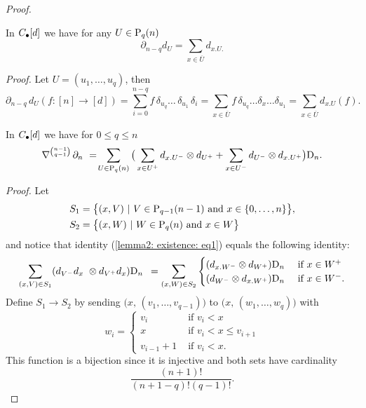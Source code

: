 \begin{proof}
	\begin{lemma} \label{lemma1: existence}
		In $\chains[d]$ we have for any $U \in \P_{q}(n)$
		\begin{equation} \label{lemma1: existence: eq1}
		\partial_{n-q} d_U = \sum_{x \in \overline{U}} d_{x.U.}
		\end{equation}
	\end{lemma}
	
	\textit{Proof.}
	Let $U = (u_1, \dots, u_q)$, then
	\begin{equation*}
	\partial_{n-q}\, d_U (f : [n] \to [d]) = 
	\sum_{i=0}^{n-q} f\, \delta_{u_q} \dots \,\delta_{u_1}\, \delta_i = 
	\sum_{x \in \overline{U}} f\, \delta_{u_q} \dots \delta_x \dots \delta_{u_1} = 
	\sum_{x \in \overline{U}} d_{x.U} (f).
	\end{equation*}
	
	\begin{lemma} \label{lemma2: existence}
		In $\chains[d]$ we have for $0 \leq q \leq n$
		\begin{equation} \label{lemma2: existence: eq1}
		\nabla^{ n-1 \choose q-1}\, \partial_n\ =\! \sum_{U \in \P_q(n)} \big( 
		\sum_{x \in U^+} d_{x.U^-} \tensor d_{U^+} + 
		\sum_{x \in U^-} d_{U^-} \tensor d_{x.U^+} \big) \D_n.
		\end{equation}
	\end{lemma}
	
	\textit{Proof.}
	Let
	\begin{align*}
	& S_1 = \big\{(x, V)\ |\ V\in\P_{q-1}(n-1) \text{ and } x\in\{0,\dots,n\}\big\}, \\
	& S_2 = \big\{(x, W)\ |\ W\in\P_{q}(n) \text{ and } x\in W\big\}
	\end{align*}
	and notice that identity (\ref{lemma2: existence: eq1}) equals the following identity:
	\begin{equation} \label{lemma2: existence: eq2}
	\sum_{(x,V) \in S_1} (d_{V^-}d_x\ \tensor d_{V^+}d_x) \D_n \ \, = 
	\sum_{(x,W) \in S_2} 
	\begin{cases}
	(d_{x.W^-} \tensor d_{W^+}) \D_n & \text{ if } x\in W^+\\
	(d_{W^-} \tensor d_{x.W^+}) \D_n & \text{ if } x\in W^-.
	\end{cases}
	\end{equation}	
	Define $S_1 \to S_2$ by sending $\big(x,\, (v_1, \dots, v_{q-1}) \big)$ to $\big(x,\, (w_1, \dots, w_{q}) \big)$ with
	\begin{equation*}
	w_i = 
	\begin{cases}
	v_i & \text{ if } v_i < x \\
	x & \text{ if } v_i < x \leq v_{i+1} \\
	v_{i-1}+1 & \text{ if } v_i < x.
	\end{cases}
	\end{equation*} 
	This function is a bijection since it is injective and both sets have cardinality 
	\begin{equation*}
	\frac{(n+1)!}{(n+1-q)!(q-1)!}.
	\end{equation*}
	

\end{proof}
